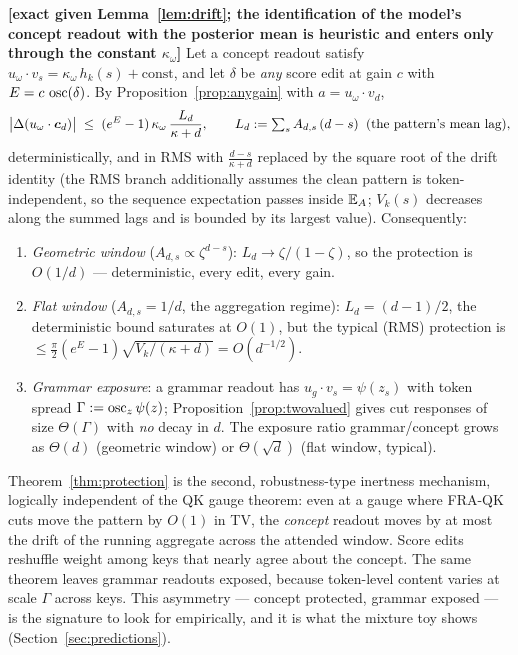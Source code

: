 \documentclass{article}
\begin{document}
\begin{theorem}\label{thm:protection}
\textbf{[exact given Lemma~\ref{lem:drift}; the identification of the model's concept readout with the posterior mean is heuristic and enters only through the constant $\kappa_\omega$]} Let a concept readout satisfy $u_\omega \cdot v_s = \kappa_\omega\, h_k(s) + \mathrm{const}$, and let $\delta$ be \emph{any} score edit at gain $c$ with $E = c\,\operatorname{osc}(\delta)$. By Proposition~\ref{prop:anygain} with $a = u_\omega\cdot v_d$,
\begin{equation}\label{eq:protection}
    \big|\Delta(u_\omega\cdot\boldsymbol{c}_d)\big| \;\le\; (e^{E} - 1)\,\kappa_\omega\,\frac{L_d}{\kappa + d},
    \qquad L_d := \textstyle\sum_s A_{d,s}\,(d - s) \;\;(\text{the pattern's mean lag}),
\end{equation}
deterministically, and in RMS with $\frac{d-s}{\kappa+d}$ replaced by the square root of the drift identity (the RMS branch additionally assumes the clean pattern is token-independent, so the sequence expectation passes inside $\mathbb{E}_A$; $V_k(s)$ decreases along the summed lags and is bounded by its largest value). Consequently:
\begin{enumerate}
    \item \emph{Geometric window} ($A_{d,s} \propto \zeta^{d-s}$): $L_d \to \zeta/(1-\zeta)$, so the protection is $O(1/d)$ --- deterministic, every edit, every gain.
    \item \emph{Flat window} ($A_{d,s} = 1/d$, the aggregation regime): $L_d = (d-1)/2$, the deterministic bound saturates at $O(1)$, but the typical (RMS) protection is $\le \tfrac{\pi}{2}(e^E - 1)\sqrt{V_k/(\kappa + d)} = O(d^{-1/2})$.
    \item \emph{Grammar exposure}: a grammar readout has $u_g \cdot v_s = \psi(z_s)$ with token spread $\Gamma := \operatorname{osc}_z \psi(z)$; Proposition~\ref{prop:twovalued} gives cut responses of size $\Theta(\Gamma)$ with \emph{no} decay in $d$. The exposure ratio grammar/concept grows as $\Theta(d)$ (geometric window) or $\Theta(\sqrt d)$ (flat window, typical).
\end{enumerate}
\end{theorem}

Theorem~\ref{thm:protection} is the second, robustness-type inertness mechanism, logically independent of the QK gauge theorem: even at a gauge where FRA-QK cuts move the pattern by $O(1)$ in TV, the \emph{concept} readout moves by at most the drift of the running aggregate across the attended window. Score edits reshuffle weight among keys that nearly agree about the concept. The same theorem leaves grammar readouts exposed, because token-level content varies at scale $\Gamma$ across keys. This asymmetry --- concept protected, grammar exposed --- is the signature to look for empirically, and it is what the mixture toy shows (Section~\ref{sec:predictions}).
\end{document}

